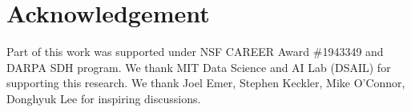 \section*{Acknowledgement}

Part of this work was supported under NSF CAREER Award \#1943349 and DARPA SDH program. We thank MIT Data Science and AI Lab (DSAIL) for supporting this research. We thank Joel Emer, Stephen Keckler, Mike O'Connor, Donghyuk Lee for inspiring discussions. 

